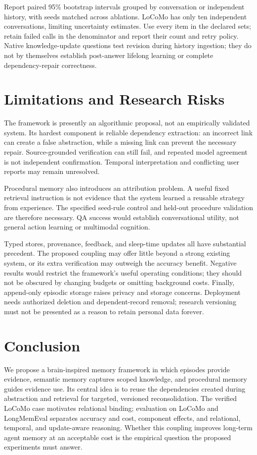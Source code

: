 \documentclass{article}
\begin{document}
Report paired 95\% bootstrap intervals grouped by conversation or independent
history, with seeds matched across ablations. LoCoMo has only ten independent
conversations, limiting uncertainty estimates. Use every item in the declared
sets; retain failed calls in the denominator and report their count and retry
policy. Native knowledge-update questions test revision during history
ingestion; they do not by themselves establish post-answer lifelong learning
or complete dependency-repair correctness.

\section{Limitations and Research Risks}
The framework is presently an algorithmic proposal, not an empirically
validated system. Its hardest component is reliable dependency extraction:
an incorrect link can create a false abstraction, while a missing link can
prevent the necessary repair. Source-grounded verification can still fail,
and repeated model agreement is not independent confirmation. Temporal
interpretation and conflicting user reports may remain unresolved.

Procedural memory also introduces an attribution problem. A useful fixed
retrieval instruction is not evidence that the system learned a reusable
strategy from experience. The specified seed-rule control and held-out
procedure validation are therefore necessary. QA success would establish
conversational utility, not general action learning or multimodal cognition.

Typed stores, provenance, feedback, and sleep-time updates all have substantial
precedent. The proposed coupling may offer little beyond a strong existing
system, or its extra verification may outweigh the accuracy benefit. Negative
results would restrict the framework's useful operating conditions; they
should not be obscured by changing budgets or omitting background costs.
Finally, append-only episodic storage raises privacy and storage concerns.
Deployment needs authorized deletion and dependent-record removal; research
versioning must not be presented as a reason to retain personal data forever.

\section{Conclusion}
We propose a brain-inspired memory framework in which episodes provide
evidence, semantic memory captures scoped knowledge, and procedural memory
guides evidence use. Its central idea is to reuse the dependencies created
during abstraction and retrieval for targeted, versioned reconsolidation.
The verified LoCoMo case motivates relational binding; evaluation on LoCoMo
and LongMemEval separates accuracy and cost, component effects, and
relational, temporal, and update-aware reasoning.
Whether this coupling improves long-term agent memory at an acceptable cost
is the empirical question the proposed experiments must answer.
\end{document}
